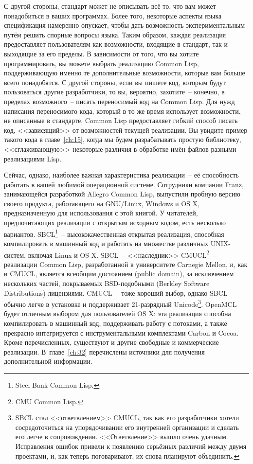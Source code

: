 С другой стороны, стандарт может не описывать всё то, что вам может понадобиться в ваших
программах. Более того, некоторые аспекты языка спецификация намеренно опускает, чтобы
дать возможность экспериментальным путём решить спорные вопросы языка.  Таким образом,
каждая реализация предоставляет пользователям как возможности, входящие в стандарт, так и
выходящие за его пределы. В зависимости от того, что вы хотите программировать, вы можете
выбрать реализацию Common Lisp, поддерживающую именно те дополнительные возможности,
которые вам больше всего понадобятся. С другой стороны, если вы пишете код, которым будут
пользоваться другие разработчики, то вы, вероятно, захотите~-- конечно, в пределах
возможного~-- писать переносимый код на Common Lisp. Для нужд написания переносимого кода,
который в то же время использует возможности, не описанные в стандарте, Common Lisp
предоставляет гибкий способ писать код, <<зависящий>> от возможностей текущей
реализации. Вы увидите пример такого кода в главе~\ref{ch:15}, когда мы будем
разрабатывать простую библиотеку, <<сглаживающую>> некоторые различия в обработке имён
файлов разными реализациями Lisp.

Сейчас, однако, наиболее важная характеристика реализации~-- её способность работать в
вашей любимой операционной системе. Сотрудники компании Franz, занимающейся разработкой
Allegro Common Lisp, выпустили пробную версию своего продукта, работающего на GNU/Linux,
Windows и OS X, предназначенную для использования с этой книгой. У читателей,
предпочитающих реализации с открытым исходным кодом, есть несколько
вариантов. SBCL\footnote{Steel Bank Common Lisp.}~-- высококачественная открытая
реализация, способная компилировать в машинный код и работать на множестве различных
UNIX-систем, включая Linux и OS X. SBCL~-- <<наследник>> CMUCL\footnote{CMU Common
  Lisp.}~-- реализации Common Lisp, разработанной в университете Carnegie Mellon,
и, как и CMUCL, является всеобщим достоянием (public domain), за исключением нескольких
частей, покрываемых BSD-подобными (Berkley Software Distributions) лицензиями. CMUCL~--
тоже хороший выбор, однако SBCL обычно легче в установке и поддерживает 21-разрядный
Unicode\footnote{SBCL стал <<ответвлением>> CMUCL, так как его разработчики хотели
  сосредоточиться на упорядочивании его внутренней организации и сделать его легче в
  сопровождении. <<Ответвление>> вышло очень удачным. Исправления ошибок привели к появлению
  серьёзных различий между двумя проектами, и, как теперь поговаривают, их снова планируют
  объединить.}. OpenMCL будет отличным выбором для пользователей OS X: эта
реализация способна компилировать в машинный код, поддерживать работу с потоками, а также
прекрасно интегрируется с инструментальными комплектами Carbon и Cocoa. Кроме
перечисленных, существуют и другие свободные и коммерческие реализации. В~главе~\ref{ch:32}
перечислены источники для получения дополнительной информации.

